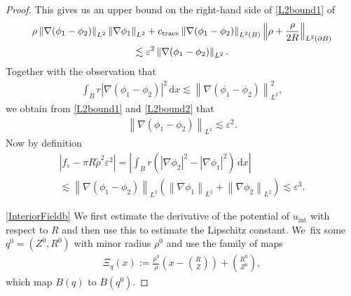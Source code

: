 \documentclass[10pt]{amsart}
\let\epsilon\varepsilon
\theoremstyle{definition}
\newcommand\norm[1]{\left\lVert #1\right\rVert}
\newcommand\Bnorm[1]{\Bigl\lVert #1\Bigr\rVert}
\newcommand\eq{=}
\newcommand\dd{\,\mathrm{d}}
\newcommand\dx{\dd x}
\let\de\partial
\let\eps\epsilon
\begin{document}
\begin{proof}
This gives us an upper bound on the right-hand side of \eqref{L2bound1} of
\begin{multline}\label{L2bound2}
\rho\norm{\nabla(\phi_1-\phi_2)}_{L^2}\norm{\nabla\phi_1}_{L^2}+c_\mathrm{trace}\norm{\nabla(\phi_1-\phi_2)}_{L^2(B)}\Bnorm{\rho+\frac{\rho}{2R}}_{L^2(\de B)}\\
\lesssim \eps^2\norm{\nabla(\phi_1-\phi_2)}_{L^2}.
\end{multline}
Together with the observation that
\begin{align*}
\int_{B}r|\nabla(\phi_1-\phi_2)|^2\dx\lesssim \norm{\nabla(\phi_1-\phi_2)}_{L^2}^2,
\end{align*}
we obtain from \eqref{L2bound1} and \eqref{L2bound2} that
\begin{align*}
\norm{\nabla(\phi_1-\phi_2)}_{L^2}\lesssim \eps^2.
\end{align*}
Now by definition
\begin{multline*}
|f_\eps-\pi R\tilde{\rho}^2\eps^2|\eq \left|\int_B r\left(|\nabla\phi_2|^2-|\nabla\phi_1|^2\right)\dx\right|\\
\lesssim \norm{\nabla(\phi_1-\phi_2)}_{L^2}\left(\norm{\nabla\phi_1}_{L^2}+\norm{\nabla\phi_2}_{L^2}\right)
\lesssim\eps^3.
\end{multline*}
\vphantom{a}

\eqref{InteriorFieldb}
We first estimate the derivative of the potential of $u_\mathrm{int}$ with respect to $R$ and then use this to estimate the Lipschitz constant. We~fix some $q^0=(Z^0,R^0)$ with minor radius $\rho^0$ and use the family of maps
\begin{align*}\Xi_q(x):=\frac{\rho^0}{\rho}\left(x-\binom{R}{Z}\right)+\binom{R^0}{Z^0},
\end{align*}
which map $B(q)$ to $B(q^0)$.


\end{proof}
\end{document}
